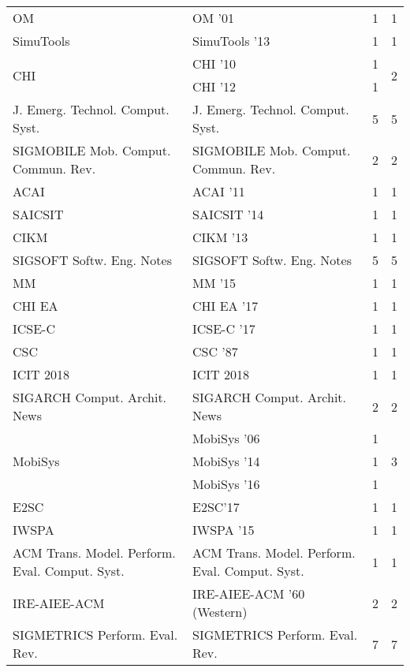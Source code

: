 \begin{table*}[t]
\begin{tabular}{llrr}
\multirow{1}{*}{OM } & OM '01 & 1 & \multirow{1}{*}{1}\\
\multirow{1}{*}{SimuTools } & SimuTools '13 & 1 & \multirow{1}{*}{1}\\
\multirow{2}{*}{CHI } & CHI '10 & 1 & \multirow{2}{*}{2}\\
& CHI '12 & 1 &\\
\multirow{1}{*}{J. Emerg. Technol. Comput. Syst.} & J. Emerg. Technol. Comput. Syst. & 5 & \multirow{1}{*}{5}\\
\multirow{1}{*}{SIGMOBILE Mob. Comput. Commun. Rev.} & SIGMOBILE Mob. Comput. Commun. Rev. & 2 & \multirow{1}{*}{2}\\
\multirow{1}{*}{ACAI } & ACAI '11 & 1 & \multirow{1}{*}{1}\\
\multirow{1}{*}{SAICSIT } & SAICSIT '14 & 1 & \multirow{1}{*}{1}\\
\multirow{1}{*}{CIKM } & CIKM '13 & 1 & \multirow{1}{*}{1}\\
\multirow{1}{*}{SIGSOFT Softw. Eng. Notes} & SIGSOFT Softw. Eng. Notes & 5 & \multirow{1}{*}{5}\\
\multirow{1}{*}{MM } & MM '15 & 1 & \multirow{1}{*}{1}\\
\multirow{1}{*}{CHI EA } & CHI EA '17 & 1 & \multirow{1}{*}{1}\\
\multirow{1}{*}{ICSE-C } & ICSE-C '17 & 1 & \multirow{1}{*}{1}\\
\multirow{1}{*}{CSC } & CSC '87 & 1 & \multirow{1}{*}{1}\\
\multirow{1}{*}{ICIT 2018} & ICIT 2018 & 1 & \multirow{1}{*}{1}\\
\multirow{1}{*}{SIGARCH Comput. Archit. News} & SIGARCH Comput. Archit. News & 2 & \multirow{1}{*}{2}\\
\multirow{3}{*}{MobiSys } & MobiSys '06 & 1 & \multirow{3}{*}{3}\\
& MobiSys '14 & 1 &\\
& MobiSys '16 & 1 &\\
\multirow{1}{*}{E2SC} & E2SC'17 & 1 & \multirow{1}{*}{1}\\
\multirow{1}{*}{IWSPA } & IWSPA '15 & 1 & \multirow{1}{*}{1}\\
\multirow{1}{*}{ACM Trans. Model. Perform. Eval. Comput. Syst.} & ACM Trans. Model. Perform. Eval. Comput. Syst. & 1 & \multirow{1}{*}{1}\\
\multirow{1}{*}{IRE-AIEE-ACM } & IRE-AIEE-ACM '60 (Western) & 2 & \multirow{1}{*}{2}\\
\multirow{1}{*}{SIGMETRICS Perform. Eval. Rev.} & SIGMETRICS Perform. Eval. Rev. & 7 & \multirow{1}{*}{7}\\

\end{tabular}
\end{table*}
